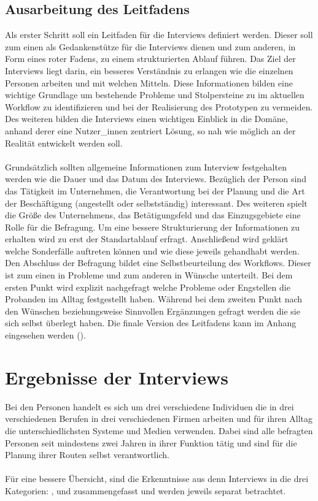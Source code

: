 \documentclass[Bachelorarbeit.tex]{subfiles}
\begin{document}
\subsection{Ausarbeitung des Leitfadens}
Als erster Schritt soll ein Leitfaden für die Interviews definiert werden. 
Dieser soll zum einen als Gedankenstütze für die Interviews dienen und zum anderen, in Form eines roter Fadens, zu einem strukturierten Ablauf führen.
Das Ziel der Interviews liegt darin, ein besseres Verständnis zu erlangen wie die einzelnen Personen arbeiten und mit welchen Mitteln.
Diese Informationen bilden eine wichtige Grundlage um bestehende Probleme und Stolpersteine zu im aktuellen Workflow zu identifizieren und bei der Realisierung des Prototypen zu vermeiden. 
Des weiteren bilden die Interviews einen wichtigen Einblick in die Domäne, anhand derer eine Nutzer\_innen zentriert Lösung, so nah wie möglich an der Realität entwickelt werden soll.\\
\\
Grundsätzlich sollten allgemeine Informationen zum Interview festgehalten werden wie die Dauer und das Datum des Interviews.
Bezüglich der Person sind das Tätigkeit im Unternehmen, die Verantwortung bei der Planung und die Art der Beschäftigung (angestellt oder selbstständig) interessant.
Des weiteren spielt die Größe des Unternehmens, das Betätigungsfeld und das Einzugsgebiete eine Rolle für die Befragung.
Um eine bessere Strukturierung der Informationen zu erhalten wird zu erst der Standartablauf erfragt. 
Anschließend wird geklärt welche Sonderfälle auftreten können und wie diese jeweils gehandhabt werden.
Den Abschluss der Befragung bildet eine Selbstbeurteilung des Workflows. 
Dieser ist zum einen in Probleme und zum anderen in Wünsche unterteilt.
Bei dem ersten Punkt wird explizit nachgefragt welche Probleme oder Engstellen die Probanden im Alltag festgestellt haben.
Während bei dem zweiten Punkt nach den Wünschen beziehungsweise Sinnvollen Ergänzungen gefragt werden die sie sich selbst überlegt haben. 
Die finale Version des Leitfadens kann im Anhang eingesehen werden (). 







\section{Ergebnisse der Interviews}
Bei den Personen handelt es sich um drei verschiedene Individuen die in drei verschiedenen Berufen in drei verschiedenen Firmen arbeiten und für ihren Alltag die unterschiedlichsten Systeme und Medien verwenden. 
Dabei sind alle befragten Personen seit mindestens zwei Jahren in ihrer Funktion tätig und sind für die Planung ihrer Routen selbst verantwortlich.
\\
\\
Für eine bessere Übersicht, sind die Erkenntnisse aus denn Interviews in die drei Kategorien: ,  und  zusammengefasst und werden jeweils separat betrachtet. 
\end{document}
